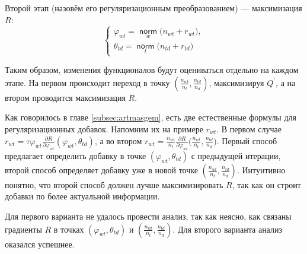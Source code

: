 \documentclass[12pt]{article}
\renewcommand{\phi}{\varphi}
\newcommand{\norm}{\mathop{\mathsf{norm}}\limits}
\begin{document}
Второй этап (назовём его регуляризационным преобразованием) --- максимизация $R$:
\[
\left\{
\begin{aligned}
 \phi_{wt}  = \norm_w \bigl(n_{wt} + r_{wt} \bigr),\\
\theta_{td} = \norm_t  \bigl(n_{td} + r_{td}\bigr)
\end{aligned}
\right.
\]

Таким образом, изменения функционалов будут оцениваться  отдельно на каждом этапе. На первом происходит переход в точку $\left(\frac{n_{wt}}{n_t}, \frac{n_{td}}{n_d}\right)$, максимизируя $Q^{\prime}$, а на втором проводится максимизация $R$. 

Как говорилось в главе \ref{subsec:artmasgem}, есть две естественные формулы для регуляризационных добавок. Напомним их на примере $r_{wt}$. В первом случае $r_{wt} = \tau\phi_{wt} \frac{\partial{R}}{\partial{\phi_{wt}}} \left( \phi_{wt}, \theta_{td}\right)$, а во втором $r_{wt} = \frac{n_{wt}}{n_t} \frac{\partial{R}}{\partial{\phi_{wt}}} \big(\frac{n_{wt}}{n_t}, \frac{n_{td}}{n_d}\big)$. Первый способ предлагает определить добавку в точке $(\phi_{wt}, \theta_{td})$ с предыдущей итерации, второй способ определяет добавку уже в новой точке $\left(\frac{n_{wt}}{n_t}, \frac{n_{td}}{n_d}\right)$. Интуитивно понятно, что второй способ  должен лучше максимизировать $R$, так как он строит добавки по более актуальной информации. 

Для первого варианта не удалось провести анализ, так как неясно, как связаны градиенты $R$ в точках $(\phi_{wt}, \theta_{td})$ и $\left(\frac{n_{wt}}{n_t}, \frac{n_{td}}{n_d}\right)$. Для второго варианта анализ оказался успешнее.
\end{document}
